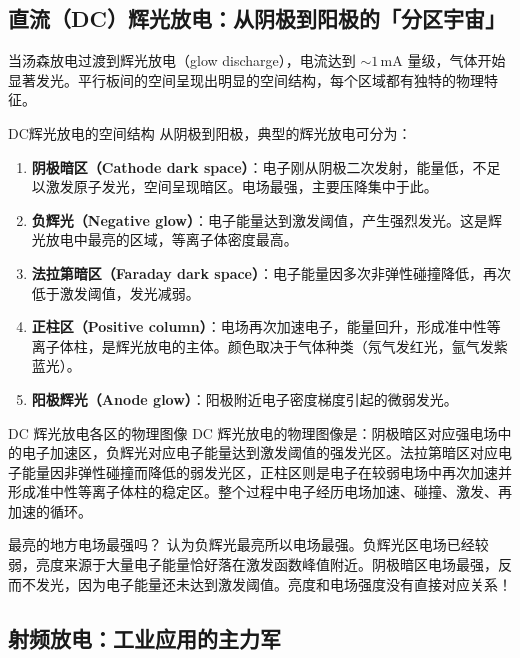\documentclass[12pt,a4paper,openany,oneside]{book}
\begin{document}
\subsection{直流（DC）辉光放电：从阴极到阳极的「分区宇宙」}

当汤森放电过渡到辉光放电（glow discharge），电流达到 $\sim 1\,\mathrm{mA}$ 量级，气体开始显著发光。平行板间的空间呈现出明显的空间结构，每个区域都有独特的物理特征。

\begin{definition}{DC辉光放电的空间结构}{}{}
\label{def:glow-regions}
从阴极到阳极，典型的辉光放电可分为：
\begin{enumerate}
\item \textbf{阴极暗区（Cathode dark space）}：电子刚从阴极二次发射，能量低，不足以激发原子发光，空间呈现暗区。电场最强，主要压降集中于此。
\item \textbf{负辉光（Negative glow）}：电子能量达到激发阈值，产生强烈发光。这是辉光放电中最亮的区域，等离子体密度最高。
\item \textbf{法拉第暗区（Faraday dark space）}：电子能量因多次非弹性碰撞降低，再次低于激发阈值，发光减弱。
\item \textbf{正柱区（Positive column）}：电场再次加速电子，能量回升，形成准中性等离子体柱，是辉光放电的主体。颜色取决于气体种类（氖气发红光，氩气发紫蓝光）。
\item \textbf{阳极辉光（Anode glow）}：阳极附近电子密度梯度引起的微弱发光。
\end{enumerate}
\end{definition}

\begin{insight}{DC 辉光放电各区的物理图像}{}
DC 辉光放电的物理图像是：阴极暗区对应强电场中的电子加速区，负辉光对应电子能量达到激发阈值的强发光区。法拉第暗区对应电子能量因非弹性碰撞而降低的弱发光区，正柱区则是电子在较弱电场中再次加速并形成准中性等离子体柱的稳定区。整个过程中电子经历电场加速、碰撞、激发、再加速的循环。
\end{insight}

\begin{warning}{最亮的地方电场最强吗？}{}
认为负辉光最亮所以电场最强。负辉光区电场已经较弱，亮度来源于大量电子能量恰好落在激发函数峰值附近。阴极暗区电场最强，反而不发光，因为电子能量还未达到激发阈值。亮度和电场强度没有直接对应关系！
\end{warning}

\subsection{射频放电：工业应用的主力军}
\end{document}
